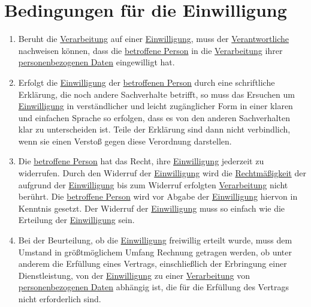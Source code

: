 \chapter{Bedingungen für die Einwilligung}
\label{ch:7}

\begin{enumerate}

  \item Beruht die \hyperref[itm:04-2]{Verarbeitung} auf einer \hyperref[itm:04-11]{Einwilligung}, muss der \hyperref
   [itm:04-7]{Verantwortliche} nachweisen können, dass die \hyperref[itm:04-1]{betroffene Person} in die \hyperref
   [itm:04-2]{Verarbeitung} ihrer \hyperref[itm:04-1]{personenbezogenen Daten} eingewilligt hat.%
  \label{itm:07-1}

  \item Erfolgt die \hyperref[itm:04-11]{Einwilligung} der \hyperref[itm:04-1]{betroffenen Person} durch eine
   schriftliche Erklärung, die noch andere Sachverhalte betrifft, so muss das Ersuchen um \hyperref[itm:04-11]
   {Einwilligung} in verständlicher und leicht zugänglicher Form in einer klaren und einfachen Sprache so erfolgen,
   dass es von den anderen Sachverhalten klar zu unterscheiden ist. Teile der Erklärung sind dann nicht verbindlich,
   wenn sie einen Verstoß gegen diese Verordnung darstellen.%
  \label{itm:07-2}

  \item Die \hyperref[itm:04-1]{betroffene Person} hat das Recht, ihre \hyperref[itm:04-11]{Einwilligung} jederzeit zu
   widerrufen. Durch den Widerruf der
   \hyperref[itm:04-11]{Einwilligung} wird die \hyperref[itm:05-1a]{Rechtmäßigkeit} der aufgrund der \hyperref
    [itm:04-11]{Einwilligung} bis zum Widerruf erfolgten \hyperref[itm:04-2]{Verarbeitung} nicht berührt. Die \hyperref
    [itm:04-1]{betroffene Person} wird vor Abgabe der \hyperref[itm:04-11]{Einwilligung} hiervon in Kenntnis gesetzt.
    Der Widerruf der
   \hyperref[itm:04-11]{Einwilligung} muss so einfach wie die Erteilung der \hyperref[itm:04-11]{Einwilligung} sein.%
  \label{itm:07-3}

  \item Bei der Beurteilung, ob die \hyperref[itm:04-11]{Einwilligung} freiwillig erteilt wurde, muss dem Umstand in
   größtmöglichem Umfang Rechnung getragen werden, ob unter anderem die Erfüllung eines Vertrags, einschließlich der
   Erbringung einer Dienstleistung, von der \hyperref[itm:04-11]{Einwilligung} zu einer \hyperref[itm:04-2]
   {Verarbeitung} von \hyperref[itm:04-1]{personenbezogenen Daten} abhängig ist, die für die Erfüllung des Vertrags
   nicht erforderlich sind.%
  \label{itm:07-4}

\end{enumerate}


